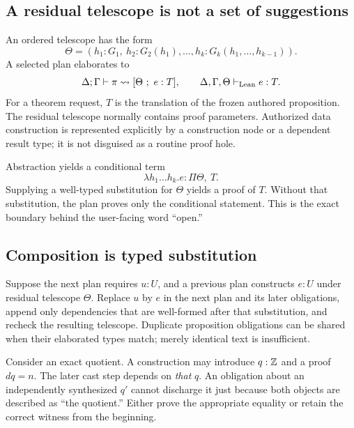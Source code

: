 \documentclass[11pt,a4paper]{article}
\numberwithin{equation}{section}
\theoremstyle{definition}\newtheorem{definition}[theorem]{Definition}
\theoremstyle{remark}\newtheorem{remark}[theorem]{Remark}
\begin{document}
\subsection{A residual telescope is not a set of suggestions}
An ordered telescope has the form
\[
 \Theta=(h_1:G_1,\ h_2:G_2(h_1),\ldots,
               h_k:G_k(h_1,\ldots,h_{k-1})).
\]
A selected plan elaborates to
\[
 \Delta;\Gamma\vdash\pi\rightsquigarrow
       [\Theta\ ;\ e:T],\qquad
 \Delta,\Gamma,\Theta\vdash_{\rm Lean}e:T.
\]
For a theorem request, \(T\) is the translation of the frozen authored
proposition. The residual telescope normally contains proof parameters.
Authorized data construction is represented explicitly by a construction
node or a dependent result type; it is not disguised as a routine proof hole.

Abstraction yields a conditional term
\[
 \lambda h_1\ldots h_k.e : \Pi\Theta,\ T.
\]
Supplying a well-typed substitution for \(\Theta\) yields a proof of \(T\).
Without that substitution, the plan proves only the conditional statement.
This is the exact boundary behind the user-facing word ``open.''

\subsection{Composition is typed substitution}
Suppose the next plan requires \(u:U\), and a previous plan constructs
\(e:U\) under residual telescope \(\Theta\). Replace \(u\) by \(e\) in the
next plan and its later obligations, append only dependencies that are
well-formed after that substitution, and recheck the resulting telescope.
Duplicate proposition obligations can be shared when their elaborated types
match; merely identical text is insufficient.

Consider an exact quotient. A construction may introduce \(q:\mathbb Z\) and a proof
\(dq=n\). The later cast step depends on \emph{that} \(q\). An obligation
about an independently synthesized \(q'\) cannot discharge it just because
both objects are described as ``the quotient.'' Either prove the appropriate
equality or retain the correct witness from the beginning.
\end{document}

